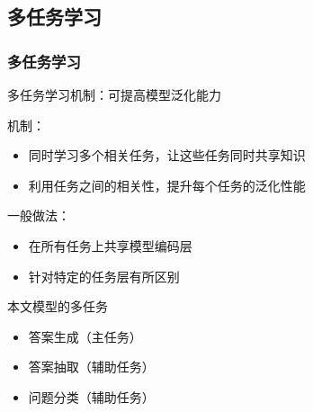 \documentclass{beamer}
\begin{document}
\subsection{多任务学习}
\begin{frame}
    \frametitle{多任务学习}

    多任务学习机制：可提高模型泛化能力

    机制：

    \begin{itemize}
        \item 同时学习多个相关任务，让这些任务同时共享知识
        \item 利用任务之间的相关性，提升每个任务的泛化性能
    \end{itemize}

    一般做法：

    \begin{itemize}
        \item 在所有任务上共享模型编码层
        \item 针对特定的任务层有所区别
    \end{itemize}

    \begin{block}{本文模型的多任务}
        \begin{itemize}
            \item 答案生成（主任务）
            \item 答案抽取（辅助任务）
            \item 问题分类（辅助任务）
        \end{itemize}
    \end{block}

\end{frame}
\end{document}

